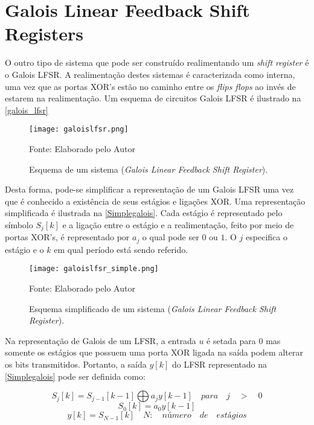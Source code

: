 \section{Galois Linear Feedback Shift Registers}

O outro tipo de sistema que pode ser construído realimentando um \textit{shift register} é o Galois LFSR. A realimentação destes sistemas é caracterizada como interna, uma vez que as portas XOR's estão no caminho entre os \textit{flips flops} ao invés de estarem na realimentação. Um esquema de circuitos Galois LFSR é ilustrado na \autoref{galois_lfsr}

\begin{figure}[H]
	\caption{\label{galois_lfsr}Esquema de um sistema (\textit{Galois Linear Feedback Shift Register}).}
	\centering
	\texttt{[image: galoislfsr.png]}
	\begin{center}
		Fonte: Elaborado pelo Autor
	\end{center}	
\end{figure}

Desta forma, pode-se simplificar a representação de um Galois LFSR uma vez que é conhecido a existência de seus estágios e ligações XOR. Uma representação simplificada é ilustrada na \autoref{Simplegalois}. Cada estágio é representado pelo símbolo $ S_{j}[k]$ e a ligação entre o estágio e a realimentação, feito por meio de portas XOR's, é representado por $a_{j}$ o qual pode ser $0$ ou $1$. O $j$ especifica o estágio e o $k$ em qual período está sendo referido.

\begin{figure}[H]
	\caption{\label{Simplegalois}Esquema simplificado de um sistema (\textit{Galois Linear Feedback Shift Register}).}
	\centering
	\texttt{[image: galoislfsr\_simple.png]}
	\begin{center}
		Fonte: Elaborado pelo Autor
	\end{center}	
\end{figure}

Na representação de Galois de um LFSR, a entrada $u$ é setada para $0$ mas somente os estágios que possuem uma porta XOR ligada na saída podem alterar os bits transmitidos. Portanto, a saída $y[k]$ do LFSR  representado na \autoref{Simplegalois} pode ser definida como:

$$ S_{j}[k] = S_{j-1}[k-1] \bigoplus a_{j}y[k-1] \quad para \quad j \quad > \quad 0 $$
$$ S_{0}[k] = a_{0}y[k-1] $$
$$ y[k] = S_{N-1}[k] \quad N: \quad número \quad de \quad estágios$$ 

